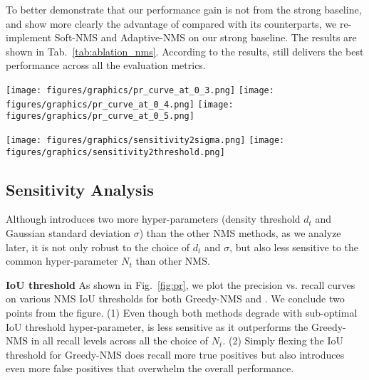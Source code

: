 \documentclass[sigconf]{acmart}
\begin{document}
To better demonstrate that our performance gain is not from the strong baseline, and show more clearly the advantage of \nmsname{} compared with its counterparts, we re-implement Soft-NMS and Adaptive-NMS on our strong baseline. The results are shown in Tab.~\ref{tab:ablation_nms}. According to the results, \nmsname{} still delivers the best performance across all the evaluation metrics.

\begin{figure*}
    \texttt{[image: figures/graphics/pr\_curve\_at\_0\_3.png]}
    \texttt{[image: figures/graphics/pr\_curve\_at\_0\_4.png]}
    \texttt{[image: figures/graphics/pr\_curve\_at\_0\_5.png]}
\vspace{-0.2cm}
    \caption{Precision vs. Recall at multiple NMS IoU thresholds $\mathbf{N_t}$ {\normalfont Experiments are conducted on the CrowdHuman validation set and all the NMS methods are implemented by us based on the same baseline.}}
    \label{fig:pr}
\end{figure*} \begin{figure*}
    \vspace{-0.3cm}
\texttt{[image: figures/graphics/sensitivity2sigma.png]}
    \texttt{[image: figures/graphics/sensitivity2threshold.png]}
    \vspace{-0.3cm}
    \caption{Sensitivity to hyper-parameters {\normalfont We show the effect of the different choices of $\sigma$ and $d_t$ on \nmsname{}. All the experiments are done on the CrowdHuman validation set.} }
    \label{fig:sigma}
\end{figure*} 
\subsection{Sensitivity Analysis}
\label{sec:sensitivity}
Although \nmsname{} introduces two more hyper-parameters (density threshold $d_t$ and Gaussian standard deviation $\sigma$) than the other NMS methods, as we analyze later, it is not only robust to the choice of $d_t$ and $\sigma$, but also less sensitive to the common hyper-parameter $N_t$ than other NMS.

\textbf{IoU threshold} As shown in Fig.~\ref{fig:pr}, we plot the precision vs. recall curves on various NMS IoU thresholds for both Greedy-NMS and \nmsname{}. We conclude two points from the figure. (1) Even though both methods degrade with sub-optimal IoU threshold hyper-parameter, \nmsname{} is less sensitive as it outperforms the Greedy-NMS in all recall levels across all the choice of $N_t$. (2) Simply flexing the IoU threshold for Greedy-NMS does recall more true positives but also introduces even more false positives that overwhelm the overall performance.
\end{document}
